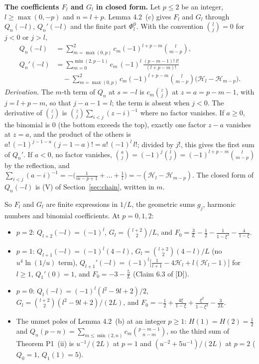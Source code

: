 \documentclass[11pt]{article}
\newcommand{\Har}{\mathcal{H}}
\begin{document}
\noindent\textbf{The coefficients $F_l$ and $G_l$ in closed form.} Let $p\le2$ be an integer, $l\ge\max(0,-p)$ and $n=l+p$. Lemma 4.2~(c) gives $F_l$ and $G_l$ through $Q_n(-l)$, $Q_n'(-l)$ and the finite part $\Phi^0_l$. With the convention $\binom{l}{j}=0$ for $j<0$ or $j>l$,
\begin{align*}
Q_n(-l)&=\sum_{m=\max(0,p)}^{2}c_m(-1)^{l+p-m}\binom{l}{m-p},\\
Q_n'(-l)&=\sum_{m=0}^{\min(2,p-1)}c_m\,(-1)^l\,\frac{(p-m-1)!\;l!}{(l+p-m)!}\\
&\quad-\sum_{m=\max(0,p)}^{2}c_m(-1)^{l+p-m}\binom{l}{m-p}\bigl(\Har_l-\Har_{m-p}\bigr).
\end{align*}
\emph{Derivation.} The $m$-th term of $Q_n$ at $s=-l$ is $c_m\binom{z}{j}$ at $z=a=p-m-1$, with $j=l+p-m$, so that $j-a-1=l$; the term is absent when $j<0$. The derivative of $\binom{z}{j}$ is $\binom{z}{j}\sum_{i<j}(z-i)^{-1}$ where no factor vanishes. If $a\ge0$, the binomial is $0$ (the bottom exceeds the top), exactly one factor $z-a$ vanishes at $z=a$, and the product of the others is $a!\,(-1)^{j-1-a}(j-1-a)!=a!\,(-1)^l\,l!$; divided by $j!$, this gives the first sum of $Q_n'$. If $a<0$, no factor vanishes, $\binom{a}{j}=(-1)^j\binom{l}{j}=(-1)^{l+p-m}\binom{l}{m-p}$ by the reflection, and $\sum_{i<j}(a-i)^{-1}=-\bigl(\frac{1}{m-p+1}+\dots+\frac1l\bigr)=-(\Har_l-\Har_{m-p})$. The closed form of $Q_n(-l)$ is (V) of Section~\ref{sec:chain}, written in $m$.

So $F_l$ and $G_l$ are finite expressions in $1/L$, the geometric sums $g_j$, harmonic numbers and binomial coefficients. At $p=0,1,2$:
\begin{itemize}
\item $p=2$: $Q_{l+2}(-l)=(-1)^l$, $G_l=\binom{l+2}{2}/L$, and $F_0=\tfrac3L-\tfrac12-\tfrac{1}{1-\xi^2}-\tfrac{4}{1-\xi}$.
\item $p=1$: $Q_{l+1}(-l)=(-1)^l(4-l)$, $G_l=\binom{l+2}{2}(4-l)/L$ (no $u^4\ln(1/u)$ term), $Q_{l+1}'(-l)=(-1)^l\bigl[\frac{1}{l+1}-4\Har_l+l(\Har_l-1)\bigr]$ for $l\ge1$, $Q_1'(0)=1$, and $F_0=-3-\tfrac5L$ (Claim 6.3 of [D]).
\item $p=0$: $Q_l(-l)=(-1)^l(l^2-9l+2)/2$, $G_l=\binom{l+2}{2}(l^2-9l+2)/(2L)$, and $F_0=-\tfrac12+\tfrac{4\xi}{1-\xi}+\tfrac{\xi^2}{1-\xi^2}-\tfrac{3}{2L}$.
\item The unmet poles of Lemma 4.2~(b) at an integer $p\ge1$: $H(1)=H(2)=\frac12$ and $Q_n(p-n)=\sum_{m\le\min(2,n)}c_m\binom{p-m-1}{n-m}$, so the third sum of Theorem P1~(ii) is $u^{-1}/(2L)$ at $p=1$ and $(u^{-2}+5u^{-1})/(2L)$ at $p=2$ ($Q_0=1$, $Q_1(1)=5$).
\end{itemize}
\end{document}
